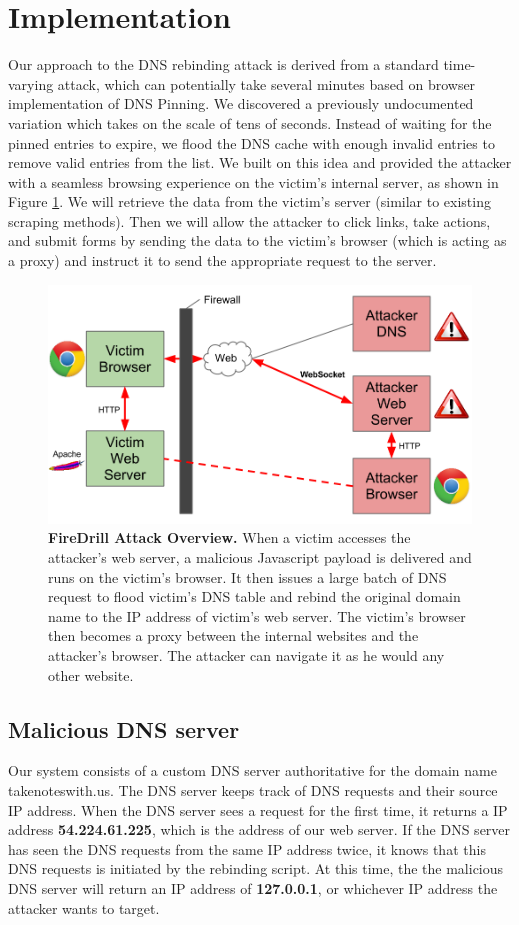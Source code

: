 \section{Implementation}
\label{sec:impl}
Our approach to the DNS rebinding attack is derived from a standard time-varying attack, which can potentially take several minutes based on browser implementation of DNS Pinning. We discovered a previously undocumented variation which takes on the scale of tens of seconds. Instead of waiting for the pinned entries to expire, we flood the DNS cache with enough invalid entries to remove valid entries from the list. We built on this idea and provided the attacker with a seamless browsing experience on the victim's internal server, as shown in Figure \ref{fig:firedrill1}. We will retrieve the data from the victim's server (similar to existing scraping methods). Then we will allow the attacker to click links, take actions, and submit forms by sending the data to the victim's browser (which is acting as a proxy) and instruct it to send the appropriate request to the server.

\begin{figure}[h]
\centering
\includegraphics[width=0.8\columnwidth]{firedrill1.png}
\caption{\textbf{FireDrill Attack Overview.} When a victim accesses the attacker's web server, a malicious Javascript payload is delivered and runs on the victim's browser. It then issues a large batch of DNS request to flood victim's DNS table and rebind the original domain name to the IP address of victim's web server. The victim's browser then becomes a proxy between the internal websites and the attacker's browser. The attacker can navigate it as he would any other website.}
\label{fig:firedrill1}
\end{figure}

\subsection{Malicious DNS server}
Our system consists of a custom DNS server authoritative for the domain name takenoteswith.us. The DNS server keeps track of DNS requests and their source IP address. When the DNS server sees a request for the first time, it returns a IP address \textbf{54.224.61.225}, which is the address of our web server. If the DNS server has seen the DNS requests from the same IP address twice, it knows that this DNS requests is initiated by the rebinding script. At this time, the the malicious DNS server will return an IP address of \textbf{127.0.0.1}, or whichever IP address the attacker wants to target.

